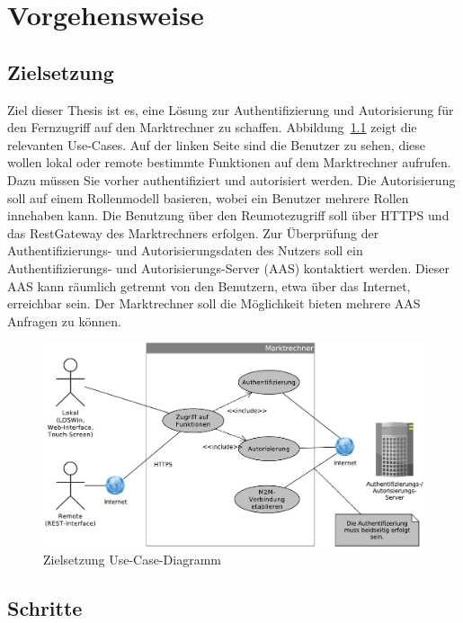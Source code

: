 \documentclass[11pt,a4paper]{report}
\begin{document}
\chapter{Vorgehensweise}

\section{Zielsetzung}

Ziel dieser Thesis ist es, eine Lösung zur Authentifizierung und Autorisierung für den Fernzugriff auf den Marktrechner zu schaffen. Abbildung~\ref{fig:uc_solution} zeigt die relevanten Use-Cases. Auf der linken Seite sind die Benutzer zu sehen, diese wollen lokal oder remote bestimmte Funktionen auf dem Marktrechner aufrufen. Dazu müssen Sie vorher authentifiziert und autorisiert werden. Die Autorisierung soll auf einem Rollenmodell basieren, wobei ein Benutzer mehrere Rollen innehaben kann. Die Benutzung über den Reumotezugriff soll über HTTPS und das RestGateway des Marktrechners erfolgen. Zur Überprüfung der Authentifizierungs- und Autorisierungsdaten des Nutzers soll ein Authentifizierungs- und  Autorisierungs-Server (AAS) kontaktiert werden. Dieser AAS kann räumlich getrennt von den Benutzern, etwa über das Internet, erreichbar sein. Der Marktrechner soll die Möglichkeit bieten mehrere AAS Anfragen zu können.

\begin{figure}[htbp]
\centering
\includegraphics[scale=0.6]{images/ziel_usecase.pdf}
\caption{Zielsetzung Use-Case-Diagramm}
\label{fig:uc_solution}
\end{figure}

\section{Schritte}
\end{document}
